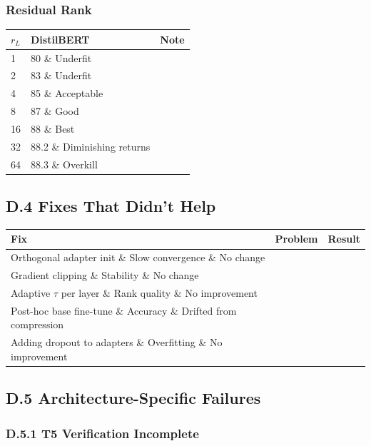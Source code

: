 \subsubsection{Residual Rank}

\begin{table}[H]
\centering
\small
\begin{tabular}{lll}
\toprule
\textbf{$r_L$} & \textbf{DistilBERT} & \textbf{Note} \\
\midrule
1 & 80 \& Underfit \\
2 & 83 \& Underfit \\
4 & 85 \& Acceptable \\
8 & 87 \& Good \\
16 & 88 \& Best \\
32 & 88.2 \& Diminishing returns \\
64 & 88.3 \& Overkill \\
\bottomrule
\end{tabular}
\end{table}

\subsection{D.4 Fixes That Didn't Help}

\begin{table}[H]
\centering
\small
\begin{tabular}{lll}
\toprule
\textbf{Fix} & \textbf{Problem} & \textbf{Result} \\
\midrule
Orthogonal adapter init \& Slow convergence \& No change \\
Gradient clipping \& Stability \& No change \\
Adaptive $\tau$ per layer \& Rank quality \& No improvement \\
Post-hoc base fine-tune \& Accuracy \& Drifted from compression \\
Adding dropout to adapters \& Overfitting \& No improvement \\
\bottomrule
\end{tabular}
\end{table}

\subsection{D.5 Architecture-Specific Failures}

\subsubsection{D.5.1 T5 Verification Incomplete}

